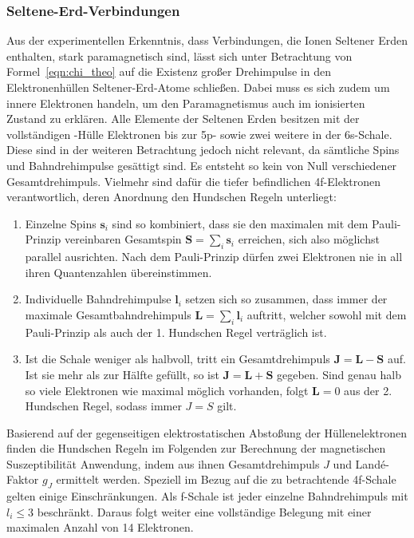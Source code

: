 \subsubsection{Seltene-Erd-Verbindungen}

Aus der experimentellen Erkenntnis, dass Verbindungen, die Ionen Seltener Erden enthalten, stark paramagnetisch sind, lässt sich
unter Betrachtung von Formel~\eqref{eqn:chi_theo} auf die Existenz großer Drehimpulse in den Elektronenhüllen Seltener-Erd-Atome
schließen. Dabei muss es sich zudem um innere Elektronen handeln, um den Paramagnetismus auch im ionisierten Zustand zu erklären.
Alle Elemente der Seltenen Erden besitzen mit der vollständigen -Hülle Elektronen bis zur 5p- sowie zwei weitere in der
6s-Schale. Diese sind in der weiteren Betrachtung jedoch nicht relevant, da sämtliche Spins und Bahndrehimpulse gesättigt sind.
Es entsteht so kein von Null verschiedener Gesamtdrehimpuls. Vielmehr sind dafür die tiefer befindlichen 4f-Elektronen
verantwortlich, deren Anordnung den Hundschen Regeln unterliegt:
\begin{enumerate}
	\item Einzelne Spins $\symbf s_i$ sind so kombiniert, dass sie den maximalen mit dem Pauli-Prinzip vereinbaren Gesamtspin
			$\symbf S = \sum_i \symbf s_i$ erreichen, sich also möglichst parallel ausrichten. Nach dem Pauli-Prinzip dürfen
			zwei Elektronen nie in all ihren Quantenzahlen übereinstimmen.
	\item Individuelle Bahndrehimpulse $\symbf l_i$ setzen sich so zusammen, dass immer der maximale Gesamtbahndrehimpuls
			$\symbf L = \sum_i \symbf l_i$ auftritt, welcher sowohl mit dem Pauli-Prinzip als auch der 1. Hundschen Regel verträglich ist.
	\item Ist die Schale weniger als halbvoll, tritt ein Gesamtdrehimpuls $\symbf J = \symbf L - \symbf S$ auf. Ist sie mehr als zur
			Hälfte gefüllt, so ist $\symbf J = \symbf L + \symbf S$ gegeben. Sind genau halb so viele Elektronen wie maximal
			möglich vorhanden, folgt $\symbf L = 0$ aus der 2. Hundschen Regel, sodass immer $J = S$ gilt.
\end{enumerate}
Basierend auf der gegenseitigen elektrostatischen Abstoßung der Hüllenelektronen finden die Hundschen Regeln im Folgenden zur
Berechnung der magnetischen Suszeptibilität Anwendung, indem aus ihnen Gesamtdrehimpuls $J$ und Landé-Faktor $g_J$ ermittelt werden.
Speziell im Bezug auf die zu betrachtende 4f-Schale gelten einige Einschränkungen. Als f-Schale ist jeder einzelne Bahndrehimpuls
mit $l_i \leq 3$ beschränkt. Daraus folgt weiter eine vollständige Belegung mit einer maximalen Anzahl von 14 Elektronen.

